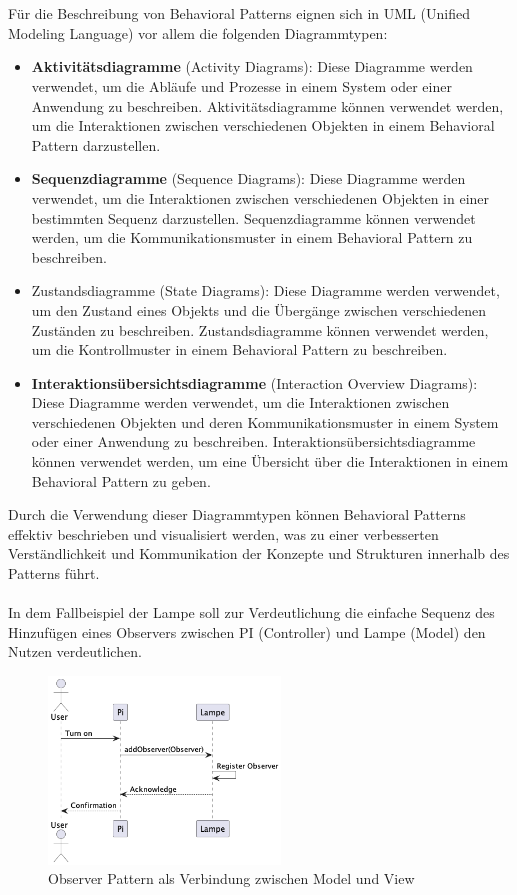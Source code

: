 \\\\
Für die Beschreibung von Behavioral Patterns eignen sich in UML (Unified Modeling Language) vor allem die folgenden Diagrammtypen:
\begin{itemize}
\item \textbf{Aktivitätsdiagramme} (Activity Diagrams): Diese Diagramme werden verwendet, um die Abläufe und Prozesse in einem System oder einer Anwendung zu beschreiben. Aktivitätsdiagramme können verwendet werden, um die Interaktionen zwischen verschiedenen Objekten in einem Behavioral Pattern darzustellen.
\item \textbf{Sequenzdiagramme} (Sequence Diagrams): Diese Diagramme werden verwendet, um die Interaktionen zwischen verschiedenen Objekten in einer bestimmten Sequenz darzustellen. Sequenzdiagramme können verwendet werden, um die Kommunikationsmuster in einem Behavioral Pattern zu beschreiben.
\item Zustandsdiagramme (State Diagrams): Diese Diagramme werden verwendet, um den Zustand eines Objekts und die Übergänge zwischen verschiedenen Zuständen zu beschreiben. Zustandsdiagramme können verwendet werden, um die Kontrollmuster in einem Behavioral Pattern zu beschreiben.
\item \textbf{Interaktionsübersichtsdiagramme} (Interaction Overview Diagrams): Diese Diagramme werden verwendet, um die Interaktionen zwischen verschiedenen Objekten und deren Kommunikationsmuster in einem System oder einer Anwendung zu beschreiben. Interaktionsübersichtsdiagramme können verwendet werden, um eine Übersicht über die Interaktionen in einem Behavioral Pattern zu geben.
\end{itemize}
Durch die Verwendung dieser Diagrammtypen können Behavioral Patterns effektiv beschrieben und visualisiert werden, was zu einer verbesserten Verständlichkeit und Kommunikation der Konzepte und Strukturen innerhalb des Patterns führt.
\\\\
In dem Fallbeispiel der Lampe soll zur Verdeutlichung die einfache Sequenz des Hinzufügen eines Observers zwischen PI (Controller) und Lampe (Model) den Nutzen verdeutlichen. 

\begin{figure}[ht]
  \centering
  \includegraphics[width=0.55\textwidth]{fig/uml/seq-mvc-observer.png}
  \caption{Observer Pattern als Verbindung zwischen Model und View}
  \label{fig:seq-mvc-observer}
\end{figure}

